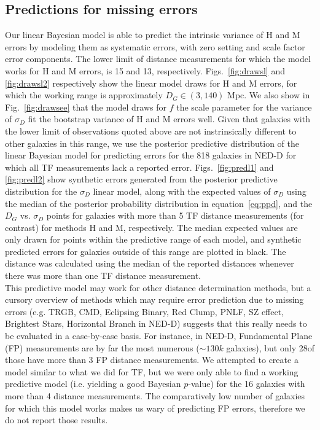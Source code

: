 \documentclass[a4paper,fleqn,usenatbib]{mnras}
\begin{document}
\subsection{Predictions for missing errors}
\label{sec:pred} 
Our linear Bayesian model is able to predict the intrinsic variance of H and M errors by modeling them as systematic errors, with zero setting and scale factor error components. The lower limit of distance measurements for which the model works for H and M errors, is 15 and 13, respectively. Figs.~\ref{fig:drawsl} and \ref{fig:drawsl2} respectively show the linear model draws for H and M errors, for which the working range is approximately $D_G\in(3,140)$ Mpc. We also show in Fig.~\ref{fig:drawsee} that the model draws for $f$ the scale parameter for the variance of $\sigma_D$ fit the bootstrap variance of H and M errors well. Given that galaxies with the lower limit of observations quoted above are not instrinsically different to other galaxies in this range, we use the posterior predictive distribution of the linear Bayesian model for predicting errors for the 818 galaxies in NED-D for which all TF measurements lack a reported error. Figs.~\ref{fig:predl1} and \ref{fig:predl2} show synthetic errors generated from the posterior predictive distribution for the $\sigma_D$ linear model, along with the expected values of $\sigma_D$ using the median of the posterior probability distribution in equation~\ref{eq:ppd}, and the $D_G$ vs. $\sigma_D$ points for galaxies with more than 5 TF distance measurements (for contrast) for methods H and M, respectively. The median expected values are only drawn for points within the predictive range of each model, and synthetic predicted errors for galaxies outside of this range are plotted in black. The distance was calculated using the median of the reported distances whenever there was more than one TF distance measurement.\\
This predictive model may work for other distance determination methods, but a cursory overview of methods which may require error prediction due to missing errors (e.g. TRGB, CMD, Eclipsing Binary, Red Clump, PNLF, SZ effect, Brightest Stars, Horizontal Branch in NED-D) suggests that this really needs to be evaluated in a case-by-case basis. For instance, in NED-D, Fundamental Plane (FP) measurements are by far the most numerous ($\sim130k$ galaxies), but only 28of those have more than 3 FP distance measurements. We attempted to create a model similar to what we did for TF, but we were only able to find a working predictive model (i.e. yielding a good Bayesian $p$-value) for the 16 galaxies with more than 4 distance measurements. The comparatively low number of galaxies for which this model works makes us wary of predicting FP errors, therefore we do not report those results.
\end{document}
